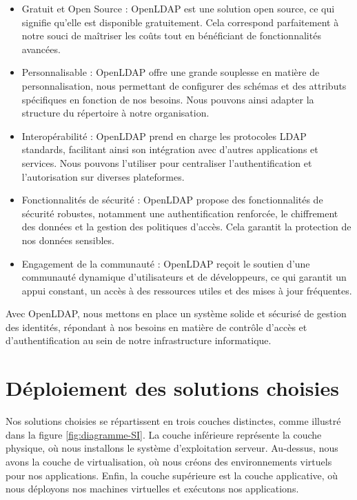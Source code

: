 \begin{itemize}


\item Gratuit et Open Source : OpenLDAP est une solution open source, ce qui signifie qu'elle est disponible gratuitement. Cela correspond parfaitement à notre souci de maîtriser les coûts tout en bénéficiant de fonctionnalités avancées.

\item Personnalisable : OpenLDAP offre une grande souplesse en matière de personnalisation, nous permettant de configurer des schémas et des attributs spécifiques en fonction de nos besoins. Nous pouvons ainsi adapter la structure du répertoire à notre organisation.

\item Interopérabilité : OpenLDAP prend en charge les protocoles LDAP standards, facilitant ainsi son intégration avec d'autres applications et services. Nous pouvons l'utiliser pour centraliser l'authentification et l'autorisation sur diverses plateformes.

\item Fonctionnalités de sécurité : OpenLDAP propose des fonctionnalités de sécurité robustes, notamment une authentification renforcée, le chiffrement des données et la gestion des politiques d'accès. Cela garantit la protection de nos données sensibles.

\item Engagement de la communauté : OpenLDAP reçoit le soutien d'une communauté dynamique d'utilisateurs et de développeurs, ce qui garantit un appui constant, un accès à des ressources utiles et des mises à jour fréquentes.


\end{itemize}


Avec OpenLDAP, nous mettons en place un système solide et sécurisé de gestion des identités, répondant à nos besoins en matière de contrôle d'accès et d'authentification au sein de notre infrastructure informatique.



\section{Déploiement des solutions choisies}

Nos solutions choisies se répartissent en trois couches distinctes, comme illustré dans la figure \ref{fig:diagramme-SI}. La couche inférieure représente la couche physique, où nous installons le système d'exploitation serveur. Au-dessus, nous avons la couche de virtualisation, où nous créons des environnements virtuels pour nos applications. Enfin, la couche supérieure est la couche applicative, où nous déployons nos machines virtuelles et exécutons nos applications.


